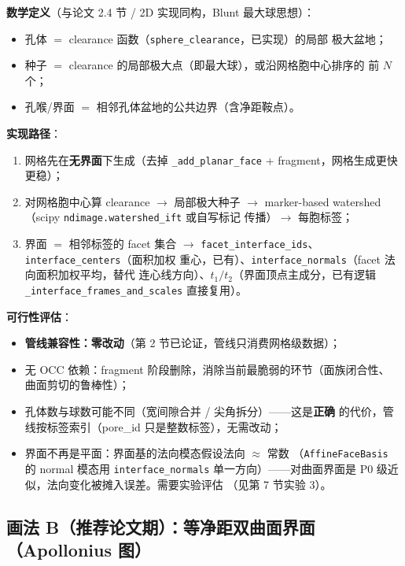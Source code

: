 \documentclass[11pt]{ctexart}
\begin{document}
\textbf{数学定义}（与论文 2.4 节 / 2D 实现同构，Blunt 最大球思想）：
\begin{itemize}
  \item 孔体 $=$ clearance 函数（\texttt{sphere\_clearance}，已实现）的局部
  极大盆地；
  \item 种子 $=$ clearance 的局部极大点（即最大球），或沿网格胞中心排序的
  前 $N$ 个；
  \item 孔喉/界面 $=$ 相邻孔体盆地的公共边界（含净距鞍点）。
\end{itemize}

\textbf{实现路径}：
\begin{enumerate}
  \item 网格先在\textbf{无界面}下生成（去掉 \texttt{\_add\_planar\_face} +
  fragment，网格生成更快更稳）；
  \item 对网格胞中心算 clearance $\rightarrow$ 局部极大种子 $\rightarrow$
  marker-based watershed（scipy \texttt{ndimage.watershed\_ift} 或自写标记
  传播）$\rightarrow$ 每胞标签；
  \item 界面 $=$ 相邻标签的 facet 集合 $\rightarrow$
  \texttt{facet\_interface\_ids}、\texttt{interface\_centers}（面积加权
  重心，已有）、\texttt{interface\_normals}（facet 法向面积加权平均，替代
  连心线方向）、$t_1/t_2$（界面顶点主成分，已有逻辑
  \texttt{\_interface\_frames\_and\_scales} 直接复用）。
\end{enumerate}

\textbf{可行性评估}：
\begin{itemize}
  \item \textbf{管线兼容性：零改动}（第 2 节已论证，管线只消费网格级数据）；
  \item 无 OCC 依赖：fragment 阶段删除，消除当前最脆弱的环节（面族闭合性、
  曲面剪切的鲁棒性）；
  \item 孔体数与球数可能不同（宽间隙合并 / 尖角拆分）——这是\textbf{正确}
  的代价，管线按标签索引（pore\_id 只是整数标签），无需改动；
  \item 界面不再是平面：界面基的法向模态假设法向 $\approx$ 常数
  （\texttt{AffineFaceBasis} 的 normal 模态用 \texttt{interface\_normals}
  单一方向）——对曲面界面是 P0 级近似，法向变化被摊入误差。需要实验评估
  （见第 7 节实验 3）。
\end{itemize}

\subsection{画法 B（推荐论文期）：等净距双曲面界面（Apollonius 图）}
\end{document}
